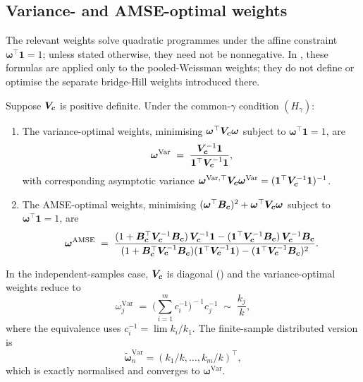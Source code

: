 \subsection{Variance- and AMSE-optimal weights}

The relevant weights solve quadratic programmes under the affine
constraint $\bm\omega^\top\bm 1=1$; unless stated otherwise, they need
not be nonnegative. In , these formulas are
applied only to the pooled-Weissman weights; they do not define or
optimise the separate bridge-Hill weights introduced there.

\begin{proposition}
\label{prop:bg:optimal-weights}
Suppose $\bm{V}_{\bm{c}}$ is positive definite. Under the common-$\gamma$
condition $(H_{\gamma})$:
\begin{enumerate}[label=(\roman*)]
\item The variance-optimal weights, minimising
      $\bm\omega^{\top}\bm{V}_{\bm{c}}\bm\omega$ subject to
      $\bm\omega^{\top}\bm 1 = 1$, are
      \[
        \bm\omega^{\mathrm{Var}}
        \;=\;
        \frac{\bm{V}_{\bm{c}}^{-1}\bm 1}{\bm 1^{\top}\bm{V}_{\bm{c}}^{-1}\bm 1},
      \]
      with corresponding asymptotic variance
      $\bm\omega^{\mathrm{Var},\top}\bm{V}_{\bm{c}}\bm\omega^{\mathrm{Var}}
        = (\bm 1^{\top}\bm{V}_{\bm{c}}^{-1}\bm 1)^{-1}$.
\item The AMSE-optimal weights, minimising
      $(\bm\omega^{\top}\bm{B}_{\bm{c}})^{2} + \bm\omega^{\top}\bm{V}_{\bm{c}}\bm\omega$
      subject to $\bm\omega^{\top}\bm 1 = 1$, are
      \[
        \bm\omega^{\mathrm{AMSE}}
        \;=\;
        \frac{(1 + \bm{B}_{\bm{c}}^{\top}\bm{V}_{\bm{c}}^{-1}\bm{B}_{\bm{c}})\,\bm{V}_{\bm{c}}^{-1}\bm 1
              - (\bm 1^{\top}\bm{V}_{\bm{c}}^{-1}\bm{B}_{\bm{c}})\,\bm{V}_{\bm{c}}^{-1}\bm{B}_{\bm{c}}}
             {(1 + \bm{B}_{\bm{c}}^{\top}\bm{V}_{\bm{c}}^{-1}\bm{B}_{\bm{c}})(\bm 1^{\top}\bm{V}_{\bm{c}}^{-1}\bm 1)
              - (\bm 1^{\top}\bm{V}_{\bm{c}}^{-1}\bm{B}_{\bm{c}})^{2}}.
      \]
\end{enumerate}
\end{proposition}

In the independent-samples case, $\bm{V}_{\bm{c}}$ is diagonal
() and the variance-optimal weights reduce
to
\begin{equation}
\label{eq:bg:V-opt-distrib}
  \omega_{j}^{\mathrm{Var}}
  \;=\;
  \Bigg(\sum_{i = 1}^{m} c_{i}^{-1}\Bigg)^{\!\!-1}\!
  c_{j}^{-1}
  \;\sim\;
  \frac{k_{j}}{k},
\end{equation}
where the equivalence uses $c_{i}^{-1} = \lim k_{i}/k_{1}$. The
finite-sample distributed version is
\[
  \tilde{\bm\omega}_{n}^{\mathrm{Var}}
  =
  (k_{1}/k,\ldots,k_{m}/k)^{\top},
\]
which is exactly normalised and converges to $\bm\omega^{\mathrm{Var}}$.

